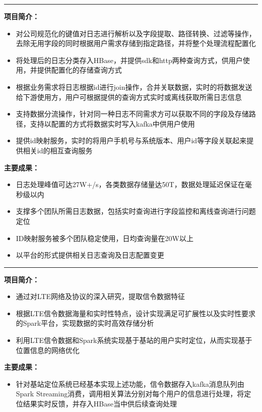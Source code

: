 \documentclass{resume}
\begin{document}
\rule{\textwidth}{0.1mm}
\textbf{项目简介：}
\begin{itemize}
  \item 对公司规范化的键值对日志进行解析以及字段提取、路径转换、过滤等操作，去除无用字段的同时根据用户需求存储到指定路径，并将整个处理流程配置化
  \item 将处理后的日志分类存入HBase，并提供sdk和http两种查询方式，供用户使用，并提供配置化的存储查询方式
  \item 根据业务需求将日志根据id进行join操作，合并关联数据，实时的将数据发送给下游使用方，用户可根据提供的查询方式实时或离线获取所需日志信息
  \item 支持数据分流操作，针对同一种日志不同需求方可以获取不同的字段及存储路径，支持以配置的方式将数据实时写入kafka中供用户使用
  \item 提供id映射服务，实时的将用户手机号与系统版本、用户id等字段关联起来提供相关id的相互查询服务
\end{itemize}
\textbf{主要成果：}
\begin{itemize}
  \item 日志处理峰值可达27W+/s，各类数据存储量达50T，数据处理延迟保证在毫秒级以内
  \item 支撑多个团队所需日志数据，包括实时查询进行字段监控和离线查询进行问题定位
  \item ID映射服务被多个团队稳定使用，日均查询量在20W以上
  \item 以平台的形式提供相关日志查询及日志配置变更
\end{itemize}

\rule{\textwidth}{0.1mm}
\begin{onehalfspacing}
\textbf{项目简介：}
\begin{itemize}
  \item 通过对LTE网络及协议的深入研究，提取信令数据特征
  \item 根据LTE信令数据海量和实时性特点，设计实现满足可扩展性以及实时性要求的Spark平台，实现数据的实时高效存储分析
  \item 利用LTE信令数据和Spark系统实现基于基站的用户实时定位，从而实现基于位置信息的网络优化
\end{itemize}
\textbf{主要成果：}
\begin{itemize}
  \item 针对基站定位系统已经基本实现上述功能，信令数据存入kafka消息队列由Spark Streaming消费，调用相关算法分别对每个用户的信息进行处理，将定位结果实时反馈，并存入HBase当中供后续查询处理
\end{itemize}
\end{onehalfspacing}
\end{document}

